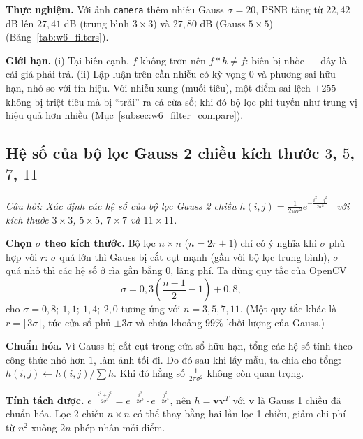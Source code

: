 \textbf{Thực nghiệm.} Với ảnh \texttt{camera} thêm nhiễu Gauss $\sigma = 20$, PSNR tăng từ $22{,}42$ dB lên $27{,}41$ dB (trung bình $3 \times 3$) và $27{,}80$ dB (Gauss $5 \times 5$) (Bảng~\ref{tab:w6_filters}).

\textbf{Giới hạn.} (i) Tại biên cạnh, $f$ không trơn nên $f * h \ne f$: biên bị nhòe — đây là cái giá phải trả. (ii) Lập luận trên cần nhiễu có kỳ vọng $0$ và phương sai hữu hạn, nhỏ so với tín hiệu. Với nhiễu xung (muối tiêu), một điểm sai lệch $\pm 255$ không bị triệt tiêu mà bị ``trải'' ra cả cửa sổ; khi đó bộ lọc phi tuyến như trung vị hiệu quả hơn nhiều (Mục~\ref{subsec:w6_filter_compare}).

\subsection{Hệ số của bộ lọc Gauss 2 chiều kích thước \texorpdfstring{$3$, $5$, $7$, $11$}{3, 5, 7, 11}}
\label{subsec:w6_gauss_kernels}

\textit{Câu hỏi: Xác định các hệ số của bộ lọc Gauss 2 chiều $h(i, j) = \frac{1}{2\pi\sigma^2}e^{-\frac{i^2 + j^2}{2\sigma^2}}$~\citep{xlav_lec5} với kích thước $3 \times 3$, $5 \times 5$, $7 \times 7$ và $11 \times 11$.}

\textbf{Chọn $\sigma$ theo kích thước.} Bộ lọc $n \times n$ ($n = 2r + 1$) chỉ có ý nghĩa khi $\sigma$ phù hợp với $r$: $\sigma$ quá lớn thì Gauss bị cắt cụt mạnh (gần với bộ lọc trung bình), $\sigma$ quá nhỏ thì các hệ số ở rìa gần bằng $0$, lãng phí. Ta dùng quy tắc của OpenCV
\begin{equation}
\sigma = 0{,}3\left(\frac{n - 1}{2} - 1\right) + 0{,}8,
\end{equation}
cho $\sigma = 0{,}8;\ 1{,}1;\ 1{,}4;\ 2{,}0$ tương ứng với $n = 3, 5, 7, 11$. (Một quy tắc khác là $r = \lceil 3\sigma \rceil$, tức cửa sổ phủ $\pm 3\sigma$ và chứa khoảng $99\%$ khối lượng của Gauss.)

\textbf{Chuẩn hóa.} Vì Gauss bị cắt cụt trong cửa sổ hữu hạn, tổng các hệ số tính theo công thức nhỏ hơn $1$, làm ảnh tối đi. Do đó sau khi lấy mẫu, ta chia cho tổng: $h(i, j) \leftarrow h(i, j) / \sum h$. Khi đó hằng số $\frac{1}{2\pi\sigma^2}$ không còn quan trọng.

\textbf{Tính tách được.} $e^{-\frac{i^2 + j^2}{2\sigma^2}} = e^{-\frac{i^2}{2\sigma^2}} \cdot e^{-\frac{j^2}{2\sigma^2}}$, nên $h = \mathbf{v}\mathbf{v}^T$ với $\mathbf{v}$ là Gauss 1 chiều đã chuẩn hóa. Lọc 2 chiều $n \times n$ có thể thay bằng hai lần lọc 1 chiều, giảm chi phí từ $n^2$ xuống $2n$ phép nhân mỗi điểm.

